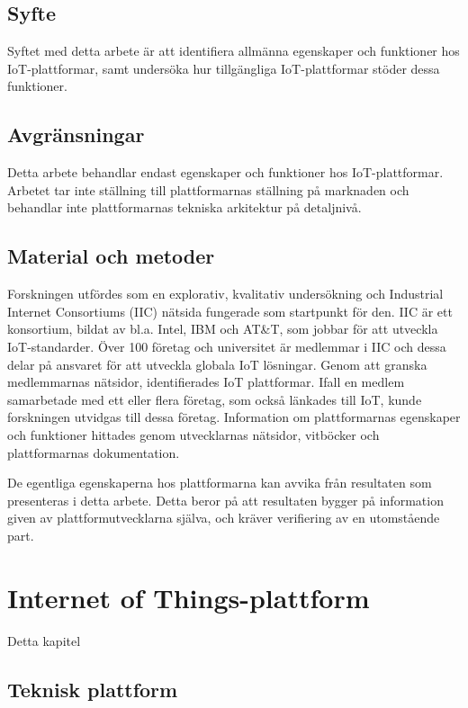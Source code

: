 \subsection{Syfte}
Syftet med detta arbete är att identifiera allmänna egenskaper och funktioner
hos IoT-plattformar, samt undersöka hur tillgängliga IoT-plattformar stöder
dessa funktioner.

\subsection{Avgränsningar}
Detta arbete behandlar endast egenskaper och funktioner hos IoT-plattformar.
Arbetet tar inte ställning till plattformarnas ställning på marknaden och
behandlar inte plattformarnas tekniska arkitektur på detaljnivå.

\subsection{Material och metoder}
Forskningen utfördes som en explorativ, kvalitativ undersökning och
Industrial Internet Consortiums (IIC) nätsida fungerade som startpunkt för den.
IIC är ett konsortium, bildat av bl.a. Intel, IBM och AT\&T, som jobbar
för att utveckla IoT-standarder. Över 100 företag och universitet är medlemmar 
i IIC och dessa delar på ansvaret för att utveckla globala IoT lösningar.
Genom att granska medlemmarnas nätsidor, identifierades IoT plattformar.
Ifall en medlem samarbetade med ett eller flera företag, som också länkades
till IoT, kunde forskningen utvidgas till dessa företag.
Information om plattformarnas egenskaper och funktioner hittades genom
utvecklarnas nätsidor, vitböcker och plattformarnas dokumentation.

De egentliga egenskaperna hos plattformarna kan avvika från resultaten
som presenteras i detta arbete. Detta beror på att resultaten bygger på
information given av plattformutvecklarna själva, och kräver verifiering
av en utomstående part.

\pagebreak




\section{Internet of Things-plattform}
\label{sec:esimluku}
Detta kapitel 

\subsection{Teknisk plattform}

